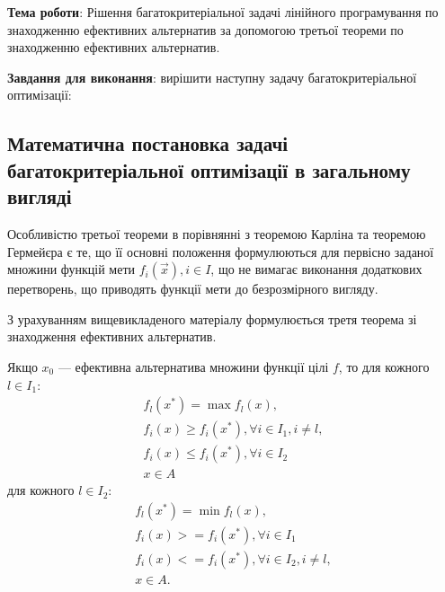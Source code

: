 


\newcommand{\labnumber}{3} %



\usepackage{systeme}
\usepackage{longtable,tabu}
\usepackage{multirow}
\usepackage{array,multirow}
\usepackage{pdflscape}
\usepackage{afterpage}
\usepackage{bm}

\graphicspath{{../figures/}}


\Ukrainian


\addtocounter{page}{1}

\textbf{Тема роботи}: Рішення багатокритеріальної задачі лінійного програмування по знаходженню ефективних альтернатив за допомогою третьої теореми по знаходженню ефективних альтернатив.

\textbf{Завдання для виконання}: вирішити наступну задачу багатокритеріальної оптимізації:


\subsection{Математична постановка задачі багатокритеріальної оптимізації в загальному вигляді}
Особливістю третьої теореми в порівнянні з теоремою Карліна та теоремою Гермейєра є те, що її основні положення формулюються для первісно заданої множини функцій мети ${f_i(\vec{x}), i \in I}$, що не вимагає виконання додаткових перетворень, що приводять функції мети до безрозмірного вигляду. 

З урахуванням вищевикладеного матеріалу формулюється третя теорема зі знаходження ефективних альтернатив.

Якщо $x_0$ --- ефективна альтернатива множини функції цілі $f$, то для кожного $l \in I_1$:
\begin{gather*} 
    f_l (x^*) = \max {f_l(x)}, \\
    f_i (x) \geq f_i(x^*), \forall i \in I_1, i \not = l, \\
    f_i (x) \leq f_i(x^*), \forall i \in I_2 \\
    x \in A
\end{gather*}
для кожного $l \in I_2$:
\begin{gather*} 
    f_l (x^*) = \min{f_l(x)}, \\
    f_i (x) >= f_i(x^*), \forall i \in I_1 \\
    f_i (x) <= f_i(x^*), \forall i \in I_2, i \not = l, \\
    x \in A.
\end{gather*}

